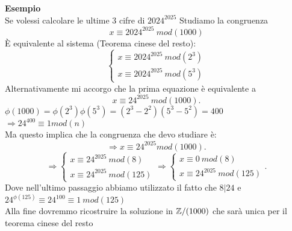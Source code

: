 \documentclass[12px]{article}
\begin{document}
	 \textbf{Esempio}\\
	 Se volessi calcolare le ultime $3$ cifre di $2024^{2025}$ Studiamo la congruenza  \[x\equiv 2024^{2025} \ mod(1000)\]
	 È equivalente al sistema (Teorema cinese del resto):\[
	 \begin{cases}
	 x\equiv 2024^{2025} \ mod(2^3)\\
	 x\equiv 2024^{2025} \ mod(5^3)
 \end{cases}\]
 Alternativamente mi accorgo che la prima equazione è equivalente a
 \[
	 x\equiv 24^{2025} \ mod(1000)
 .\] 
 $\phi(1000) = \phi(2^3)\phi(5^3) = (2^3 - 2^2)(5^3-5^2) = 400$\\
 $ \Rightarrow 24^{400} \equiv 1 mod(n)$\\
 Ma questo implica che la congruenza che devo studiare è:
 \[
 \Rightarrow x\equiv 24^{2025} mod(1000)
 .\] 
 \[
 \Rightarrow \begin{cases}
	 x\equiv 24^{2025}\ mod(8)\\
	 x\equiv 24^{2025}\ mod(125)
 \end{cases} \Rightarrow \begin{cases}
 	x\equiv 0\ mod(8)\\
	x\equiv 24^{2025} \ mod(125)
 \end{cases}
 .\] 
 Dove nell'ultimo passaggio abbiamo utilizzato il fatto che $8|24$ e $24^{\phi(125)}\equiv 24^{100}\equiv 1\ mod(125)$\\
 Alla fine dovremmo ricostruire la soluzione in $\mathbb{Z}/(1000)$ che sarà unica per il teorema cinese del resto\newpage
\end{document}
